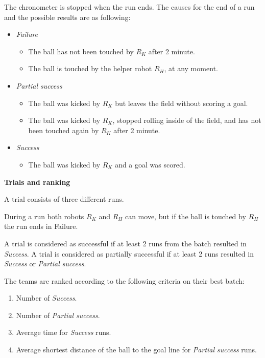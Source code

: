 {The chronometer is stopped when the run ends. The causes for the end of a run and
the possible results are as following:
\begin{itemize}
\item \textit{Failure}
  \begin{itemize}
    \item The ball has not been touched by $R_K$ after 2 minute. 
     \item The ball is touched by the helper robot $R_H$, at any moment. 
  \end{itemize}
\item \textit{Partial success}
  \begin{itemize}
    \item The ball was kicked by $R_K$ but leaves the field without scoring a goal.
    \item The ball was kicked by $R_K$, stopped rolling inside of the field, and has not been touched again by $R_K$ after 2 minute.
  \end{itemize}
\item \textit{Success}
  \begin{itemize}
    \item The ball was kicked by $R_K$ and a goal was scored.
  \end{itemize}
\end{itemize}

{\bfseries Trials and ranking}

\smallskip

A trial consists of three different runs. 

During a run both robots $R_K$ and $R_H$ can move, but if the ball is touched by $R_H$ the run ends in Failure.

A trial is considered as successful if at least 2
runs from the batch resulted in \textit{Success}. A trial is considered as
partially successful if at least 2 runs resulted in \textit{Success} or \textit{Partial success}.

The teams are ranked according to the following criteria on their best batch:
\begin{enumerate}
\item Number of \textit{Success}.
\item Number of \textit{Partial success}.
\item Average time for \textit{Success} runs.
\item Average shortest distance of the ball to the goal line for \textit{Partial success} runs.
\end{enumerate}




}
